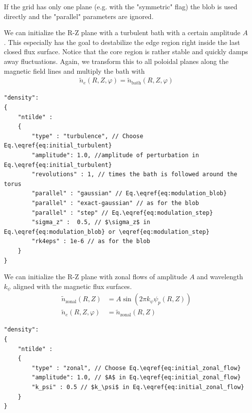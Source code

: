 If the grid has only one plane (e.g. with the "symmetric" flag) the blob is used
directly and the "parallel" parameters are ignored.

We can initialize the R-Z plane with a turbulent bath with a certain amplitude $A$.
This especially has the goal to destabilize the edge region right inside the
last closed flux surface. Notice that the core region is rather stable
and quickly damps away fluctuations.
Again, we transform this to all poloidal planes along the magnetic field lines and multiply the bath with
\begin{align} \label{eq:initial_turbulent}
    \tilde n_e(R,Z,\varphi) = \tilde n_{\text{bath}}(R,Z,\varphi)
\end{align}
\begin{verbatim}
"density":
{
    "ntilde" :
    {
        "type" : "turbulence", // Choose Eq.\eqref{eq:initial_turbulent}
        "amplitude": 1.0, //amplitude of perturbation in Eq.\eqref{eq:initial_turbulent}
        "revolutions" : 1, // times the bath is followed around the torus
        "parallel" : "gaussian" // Eq.\eqref{eq:modulation_blob}
        "parallel" : "exact-gaussian" // as for the blob
        "parallel" : "step" // Eq.\eqref{eq:modulation_step}
        "sigma_z" :  0.5, // $\sigma_z$ in Eq.\eqref{eq:modulation_blob} or \eqref{eq:modulation_step}
        "rk4eps" : 1e-6 // as for the blob
    }
}
\end{verbatim}
We can initialize the R-Z plane with zonal flows of amplitude $A$ and
wavelength $k_\psi$ aligned with the magnetic flux surfaces.
\begin{align} \label{eq:initial_zonal_flow}
    \tilde n_{\text{zonal}}(R,Z) &= A \sin (2\pi k_\psi \psi_p(R,Z)) \nonumber\\
\tilde n_e(R,Z,\varphi) &= \tilde n_{\text{zonal}}(R,Z)
\end{align}
\begin{verbatim}
"density":
{
    "ntilde" :
    {
        "type" : "zonal", // Choose Eq.\eqref{eq:initial_zonal_flow}
        "amplitude": 1.0, // $A$ in Eq.\eqref{eq:initial_zonal_flow}
        "k_psi" : 0.5 // $k_\psi$ in Eq.\eqref{eq:initial_zonal_flow}
    }
}
\end{verbatim}
